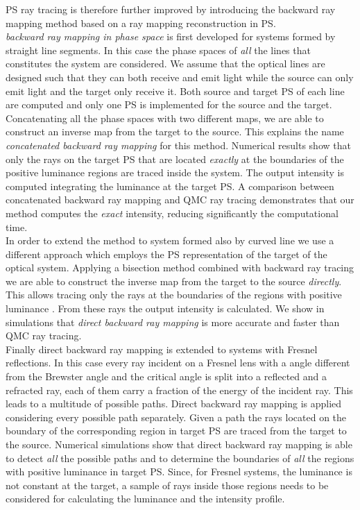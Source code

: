 PS ray tracing is therefore further improved by introducing the backward ray mapping method based on a ray mapping reconstruction in PS. 
\\ \indent
\textit{backward ray mapping in phase space} is first developed for systems formed by straight line segments. In this case the phase spaces of \textit{all} the lines that constitutes the system are considered. We assume that the optical lines are designed such that they can both receive and emit light while the source can only emit light and the target only receive it. Both source and target PS of each line are computed and only one PS is implemented for the source and the target. Concatenating all the phase spaces with two different maps, we are able to construct an inverse map from the target to the source. This explains the name \textit{concatenated backward ray mapping} for this method. Numerical results show that only the rays on the target PS that are located \textit{exactly} at the boundaries of the positive luminance regions are traced inside the system. The output intensity is computed integrating the luminance at the target PS. A comparison between concatenated backward ray mapping and QMC ray tracing demonstrates that our method computes the \textit{exact} intensity, reducing significantly the computational time. \\ \indent In order to extend the method to system formed also by curved line we use a different approach which employs the PS representation of the target of the optical system. Applying a bisection method combined with backward ray tracing we are able to construct the inverse map from the target to the source \textit{directly}. This allows tracing only the rays at the boundaries of the regions with positive luminance \cite{filosa2017inverse}. From these rays the output intensity is calculated. We show in simulations that \textit{direct backward ray mapping} is more accurate and faster than QMC ray tracing. \\ \indent Finally direct backward ray mapping is extended to systems with Fresnel reflections. In this case every ray incident on a Fresnel lens with a angle different from the Brewster angle and the critical angle is split into a reflected and a refracted ray, each of them carry a fraction of the energy of the incident ray. This leads to a multitude of possible paths. Direct backward ray mapping is applied considering every possible path separately. Given a path the rays located on the boundary of the corresponding region in target PS are traced from the target to the source. Numerical simulations show that direct backward ray mapping is able to detect \textit{all} the possible paths and to determine the boundaries of \textit{all} the regions with positive luminance in target PS. Since, for Fresnel systems, the luminance is not constant at the target, a sample of rays inside those regions needs to be considered for calculating the luminance and the intensity profile.
